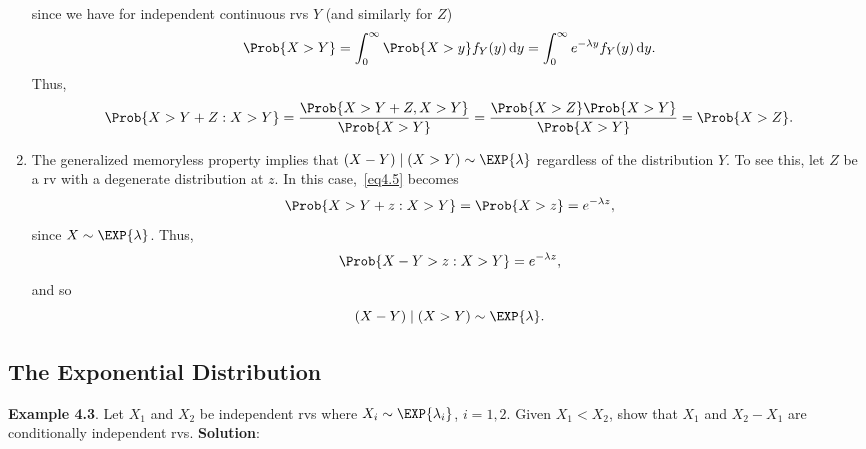 \begin{enumerate}[(1)]
          since we have for independent continuous rvs $ Y $ (and similarly for $ Z $)
          \[ \Prob{X>Y}=\int_{0}^{\infty}\Prob{X>y}f_Y(y)\odif{y}=\int_{0}^{\infty}e^{-\lambda y}f_Y(y)\odif{y}. \]
          Thus,
          \[ \Prob{X>Y+Z\given X>Y}=\frac{\Prob{X>Y+Z,X>Y}}{\Prob{X>Y}}=\frac{\Prob{X>Z}\Prob{X>Y}}{\Prob{X>Y}}=\Prob{X>Z}. \]
    \item The generalized memoryless property implies that $ (X-Y)\mid(X>Y)\sim \EXP{\lambda} $ regardless of the distribution $ Y $. To see this,
          let $ Z $ be a rv with a degenerate distribution at $ z $. In this case,~\ref{eq4.5} becomes
          \[ \Prob{X>Y+z\given X>Y}=\Prob{X>z}=e^{-\lambda z}, \]
          since $ X \sim \EXP{\lambda} $. Thus,
          \[ \Prob{X-Y>z\given X>Y}=e^{-\lambda z}, \]
          and so
          \[ (X-Y)\mid(X>Y)\sim \EXP{\lambda}.  \]
\end{enumerate}
\subsection*{The Exponential Distribution}
\begin{Example}
    \textbf{Example 4.3}. Let $ X_1 $ and $ X_2 $ be independent rvs where $ X_i \sim \EXP{\lambda_i} $, $ i=1,2 $. Given
    $ X_1<X_2 $, show that $ X_1 $ and $ X_2-X_1 $ are conditionally independent rvs.
    \tcblower{}
    \textbf{Solution}:
\end{Example}
